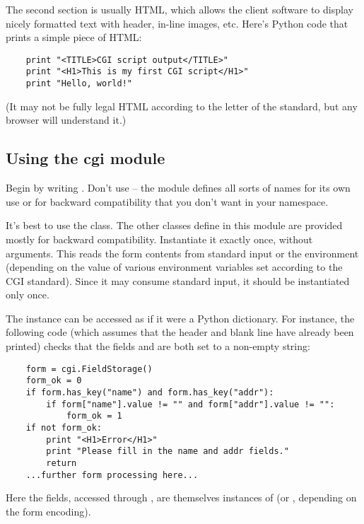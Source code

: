 The second section is usually HTML, which allows the client software
to display nicely formatted text with header, in-line images, etc.
Here's Python code that prints a simple piece of HTML:

\begin{verbatim}
	print "<TITLE>CGI script output</TITLE>"
	print "<H1>This is my first CGI script</H1>"
	print "Hello, world!"
\end{verbatim}

(It may not be fully legal HTML according to the letter of the
standard, but any browser will understand it.)

\subsection{Using the cgi module}

Begin by writing .  Don't use  -- the
module defines all sorts of names for its own use or for backward 
compatibility that you don't want in your namespace.

It's best to use the  class.  The other classes define in this 
module are provided mostly for backward compatibility.  Instantiate it 
exactly once, without arguments.  This reads the form contents from 
standard input or the environment (depending on the value of various 
environment variables set according to the CGI standard).  Since it may 
consume standard input, it should be instantiated only once.

The  instance can be accessed as if it were a Python 
dictionary.  For instance, the following code (which assumes that the 
 header and blank line have already been printed) checks that 
the fields  and  are both set to a non-empty string:

\begin{verbatim}
	form = cgi.FieldStorage()
	form_ok = 0
	if form.has_key("name") and form.has_key("addr"):
		if form["name"].value != "" and form["addr"].value != "":
			form_ok = 1
	if not form_ok:
		print "<H1>Error</H1>"
		print "Please fill in the name and addr fields."
		return
	...further form processing here...
\end{verbatim}

Here the fields, accessed through , are themselves instances
of  (or , depending on the form encoding).

